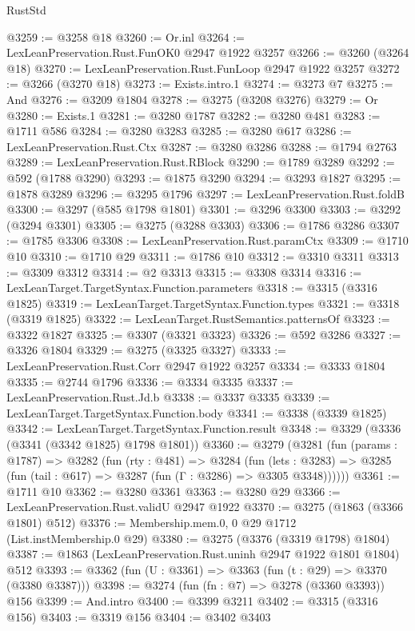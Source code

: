 \begin{lexlean}{RustStd}
\begin{coremodule}
@3259 := @3258 @18
@3260 := Or.inl
@3264 := LexLeanPreservation.Rust.FunOK0 @2947 @1922 @3257
@3266 := @3260 (@3264 @18)
@3270 := LexLeanPreservation.Rust.FunLoop @2947 @1922 @3257
@3272 := @3266 (@3270 @18)
@3273 := Exists.intro.{1}
@3274 := @3273 @7
@3275 := And
@3276 := @3209 @1804
@3278 := @3275 (@3208 @3276)
@3279 := Or
@3280 := Exists.{1}
@3281 := @3280 @1787
@3282 := @3280 @481
@3283 := @1711 @586
@3284 := @3280 @3283
@3285 := @3280 @617
@3286 := LexLeanPreservation.Rust.Ctx
@3287 := @3280 @3286
@3288 := @1794 @2763
@3289 := LexLeanPreservation.Rust.RBlock
@3290 := @1789 @3289
@3292 := @592 (@1788 @3290)
@3293 := @1875 @3290
@3294 := @3293 @1827
@3295 := @1878 @3289
@3296 := @3295 @1796
@3297 := LexLeanPreservation.Rust.foldB
@3300 := @3297 (@585 @1798 @1801)
@3301 := @3296 @3300
@3303 := @3292 (@3294 @3301)
@3305 := @3275 (@3288 @3303)
@3306 := @1786 @3286
@3307 := @1785 @3306
@3308 := LexLeanPreservation.Rust.paramCtx
@3309 := @1710 @10
@3310 := @1710 @29
@3311 := @1786 @10
@3312 := @3310 @3311
@3313 := @3309 @3312
@3314 := @2 @3313
@3315 := @3308 @3314
@3316 := LexLeanTarget.TargetSyntax.Function.parameters
@3318 := @3315 (@3316 @1825)
@3319 := LexLeanTarget.TargetSyntax.Function.types
@3321 := @3318 (@3319 @1825)
@3322 := LexLeanTarget.RustSemantics.patternsOf
@3323 := @3322 @1827
@3325 := @3307 (@3321 @3323)
@3326 := @592 @3286
@3327 := @3326 @1804
@3329 := @3275 (@3325 @3327)
@3333 := LexLeanPreservation.Rust.Corr @2947 @1922 @3257
@3334 := @3333 @1804
@3335 := @2744 @1796
@3336 := @3334 @3335
@3337 := LexLeanPreservation.Rust.Jd.b
@3338 := @3337 @3335
@3339 := LexLeanTarget.TargetSyntax.Function.body
@3341 := @3338 (@3339 @1825)
@3342 := LexLeanTarget.TargetSyntax.Function.result
@3348 := @3329 (@3336 (@3341 (@3342 @1825) @1798 @1801))
@3360 := @3279
    (@3281
      (fun (params : @1787) =>
      @3282
        (fun (rty : @481) =>
        @3284
          (fun (lets : @3283) =>
          @3285 (fun (tail : @617) => @3287 (fun (Γ : @3286) => @3305 @3348))))))
@3361 := @1711 @10
@3362 := @3280 @3361
@3363 := @3280 @29
@3366 := LexLeanPreservation.Rust.validU @2947 @1922
@3370 := @3275 (@1863 (@3366 @1801) @512)
@3376 := Membership.mem.{0, 0} @29 @1712 (List.instMembership.{0} @29)
@3380 := @3275 (@3376 (@3319 @1798) @1804)
@3387 := @1863 (LexLeanPreservation.Rust.uninh @2947 @1922 @1801 @1804) @512
@3393 := @3362 (fun (U : @3361) => @3363 (fun (t : @29) => @3370 (@3380 @3387)))
@3398 := @3274 (fun (fn : @7) => @3278 (@3360 @3393)) @156
@3399 := And.intro
@3400 := @3399 @3211
@3402 := @3315 (@3316 @156)
@3403 := @3319 @156
@3404 := @3402 @3403

\end{coremodule}
\end{lexlean}
